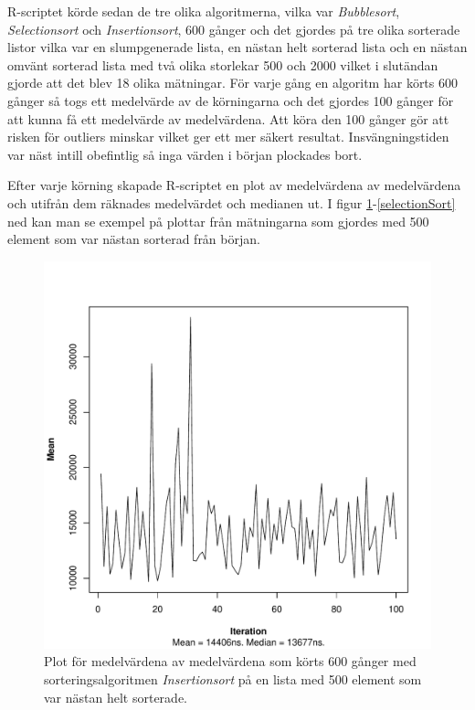 \documentclass[a4paper]{article}
\begin{document}
R-scriptet körde sedan de tre olika algoritmerna, vilka var \emph{Bubblesort}, \emph{Selectionsort} och \emph{Insertionsort}, 600 gånger och det gjordes på tre olika sorterade listor vilka var en slumpgenerade lista, en nästan helt sorterad lista och en nästan omvänt sorterad lista med två olika storlekar 500 och 2000 vilket i slutändan gjorde att det blev 18 olika mätningar. För varje gång en algoritm har körts 600 gånger så togs ett medelvärde av de körningarna och det gjordes 100 gånger för att kunna få ett medelvärde av medelvärdena. Att köra den 100 gånger gör att risken för outliers minskar vilket ger ett mer säkert resultat. Insvängningstiden var näst intill obefintlig så inga värden i början plockades bort.

Efter varje körning skapade R-scriptet en plot av medelvärdena av medelvärdena och utifrån dem räknades medelvärdet och medianen ut. I figur \ref{insertionSort}-\ref{selectionSort} ned kan man se exempel på plottar från mätningarna som gjordes med 500 element som var nästan sorterad från början.

\begin{figure}[H]
	\begin{center}
		\includegraphics[scale=0.4]{output/500/AlmostSorted/insertionSort_almost_sorted_500_600_100.pdf}
		\caption{Plot för medelvärdena av medelvärdena som körts 600 gånger med sorteringsalgoritmen \emph{Insertionsort} på en lista med 500 element som var nästan helt sorterade.}
		\label{insertionSort}
	\end{center}
\end{figure}
\end{document}
